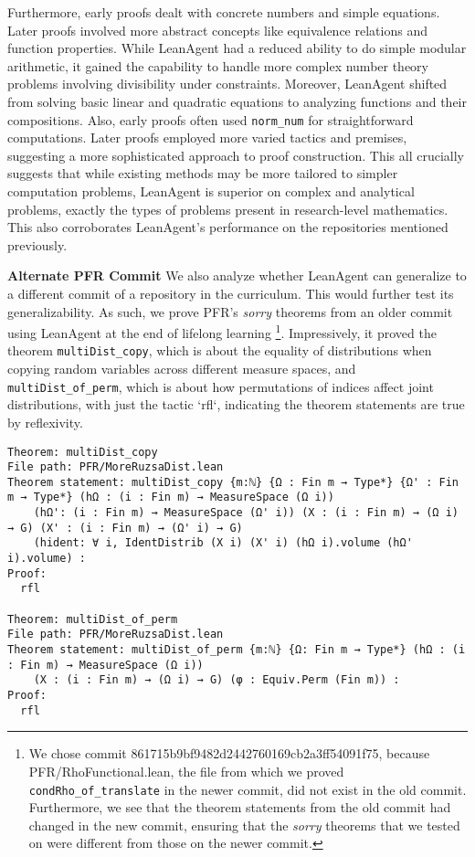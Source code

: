 \documentclass{article} %
\begin{document}
Furthermore, early proofs dealt with concrete numbers and simple equations. Later proofs involved more abstract concepts like equivalence relations and function properties. While LeanAgent had a reduced ability to do simple modular arithmetic, it gained the capability to handle more complex number theory problems involving divisibility under constraints. Moreover, LeanAgent shifted from solving basic linear and quadratic equations to analyzing functions and their compositions. Also, early proofs often used \texttt{norm\_num} for straightforward computations. Later proofs employed more varied tactics and premises, suggesting a more sophisticated approach to proof construction. This all crucially suggests that while existing methods may be more tailored to simpler computation problems, LeanAgent is superior on complex and analytical problems, exactly the types of problems present in research-level mathematics. This also corroborates LeanAgent's performance on the repositories mentioned previously.

\textbf{Alternate PFR Commit} We also analyze whether LeanAgent can generalize to a different commit of a repository in the curriculum. This would further test its generalizability. As such, we prove PFR's \textit{sorry} theorems from an older commit using LeanAgent at the end of lifelong learning \footnote{We chose commit 861715b9bf9482d2442760169cb2a3ff54091f75, because PFR/RhoFunctional.lean, the file from which we proved \texttt{condRho\_of\_translate} in the newer commit, did not exist in the old commit. Furthermore, we see that the theorem statements from the old commit had changed in the new commit, ensuring that the \textit{sorry} theorems that we tested on were different from those on the newer commit.}. Impressively, it proved the theorem \texttt{multiDist\_copy}, which is about the equality of distributions when copying random variables across different measure spaces, and \texttt{multiDist\_of\_perm}, which is about how permutations of indices affect joint distributions, with just the tactic `rfl`, indicating the theorem statements are true by reflexivity.

\begin{verbatim}
Theorem: multiDist_copy
File path: PFR/MoreRuzsaDist.lean
Theorem statement: multiDist_copy {m:ℕ} {Ω : Fin m → Type*} {Ω' : Fin m → Type*} (hΩ : (i : Fin m) → MeasureSpace (Ω i))
    (hΩ': (i : Fin m) → MeasureSpace (Ω' i)) (X : (i : Fin m) → (Ω i) → G) (X' : (i : Fin m) → (Ω' i) → G)
    (hident: ∀ i, IdentDistrib (X i) (X' i) (hΩ i).volume (hΩ' i).volume) :
Proof:
  rfl

Theorem: multiDist_of_perm
File path: PFR/MoreRuzsaDist.lean
Theorem statement: multiDist_of_perm {m:ℕ} {Ω: Fin m → Type*} (hΩ : (i : Fin m) → MeasureSpace (Ω i))
    (X : (i : Fin m) → (Ω i) → G) (φ : Equiv.Perm (Fin m)) :
Proof:
  rfl
\end{verbatim}
\end{document}
